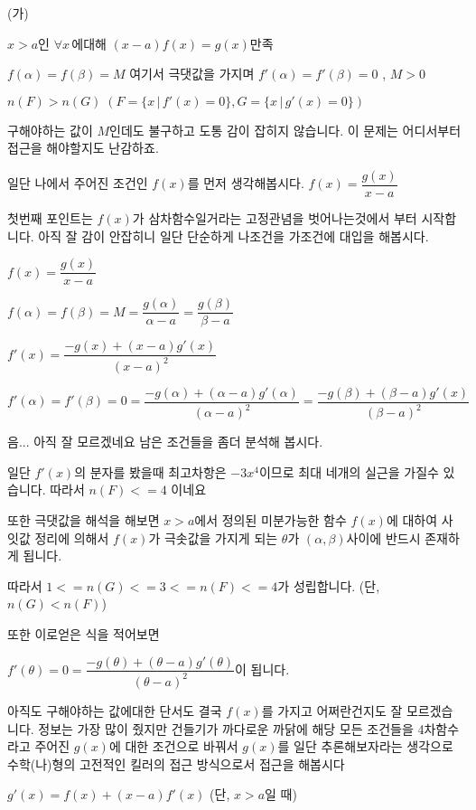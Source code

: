 \documentclass{oblivoir}
\begin{document}
   \begin{condition}{(가)}
   \item $x>a$인 $\forall x$\,에대해 $(x-a)f(x)=g(x)$만족
   \item $f(\alpha)=f(\beta)=M$ 여기서 극댓값을 가지며 $f'(\alpha)=f'(\beta)=0$ , $M > 0$
   \item $n(F) > n(G) \;(F = \{ x\,|\,f'(x)=0 \} , G = \{ x\,|\,g'(x) =0 \}) $
   \end{condition}
구해야하는 값이 $M$인데도 불구하고 도통 감이 잡히지 않습니다. 이 문제는 어디서부터 접근을 해야할지도 난감하죠.\par 일단 나에서 주어진 조건인
$f(x)$를 먼저 생각해봅시다. $f(x) =\dfrac{g(x)}{x-a}$ \par 첫번째 포인트는  $f(x)$가 삼차함수일거라는 고정관념을 벗어나는것에서 부터 시작합니다. 아직 잘 감이 안잡히니 일단 단순하게 나조건을 가조건에 대입을 해봅시다.\par
$f(x) =\dfrac{g(x)}{x-a}$ \par $f(\alpha)=f(\beta)=M=\dfrac{g(\alpha)}{\alpha-a}=\dfrac{g(\beta)}{\beta-a}$\par $f'(x) =\dfrac{-g(x)+(x-a)g'(x)}{(x-a)^2}$\par $f'(\alpha)=f'(\beta)=0=\dfrac{-g(\alpha)+(\alpha-a)g'(\alpha)}{(\alpha-a)^2}=\dfrac{-g(\beta)+(\beta-a)g'(x)}{(\beta-a)^2}$\par
음... 아직 잘 모르겠네요 남은 조건들을 좀더 분석해 봅시다. \par 일단 $f'(x)$의 분자를 봤을때 최고차항은 $-3x^4$이므로 최대 네개의 실근을 가질수 있습니다. 따라서 $n(F) <= 4$ 이네요 \par
또한 극댓값을 해석을 해보면 $x>a$에서 정의된 미분가능한 함수 $f(x)$에 대하여 사잇값 정리에 의해서 $f(x)$가 극솟값을 가지게 되는 $\theta$가 $( \alpha, \beta) $사이에 반드시 존재하게 됩니다.\par 따라서 $1<= n(G) <= 3<= n(F) <= 4$가 성립합니다. (단, $n(G) < n(F)$)\par 또한 이로얻은 식을 적어보면 \par
$f'(\theta) = 0 = \dfrac{-g(\theta)+(\theta-a)g'(\theta)}{(\theta-a)^2}$이 됩니다.\par
아직도 구해야하는 값에대한 단서도 결국 $f(x)$를 가지고 어쩌란건지도 잘 모르겠습니다. 정보는 가장 많이 줬지만 건들기가 까다로운 까닭에 해당 모든 조건들을 4차함수라고 주어진  $g(x)$에 대한 조건으로 바꿔서 $g(x)$를 일단 추론해보자라는 생각으로 수학(나)형의 고전적인 킬러의 접근 방식으로서 접근을 해봅시다\par
$g'(x) = f(x) + (x-a)f'(x)$ (단, $x>a$일 때) \par
\end{document}
